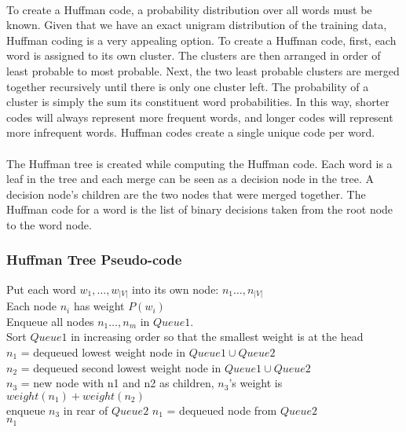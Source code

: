 \documentclass[12pt]{ociamthesis}  %
\begin{document}
\paragraph{}
To create a Huffman code, a probability distribution over all words must be known. Given that we have an exact unigram distribution of the training data, Huffman coding is a very appealing option. To create a Huffman code, first, each word is assigned to its own cluster.  The clusters are then arranged in order of least probable to most probable. Next, the two least probable clusters are merged together recursively until there is only one cluster left. The probability of a cluster is simply the sum its constituent word probabilities. In this way, shorter codes will always represent more frequent words, and longer codes will represent more infrequent words. Huffman codes create a single unique code per word.
\paragraph{}
The Huffman tree is created while computing the Huffman code. Each word is a leaf in the tree and each merge can be seen as a decision node in the tree. A decision node's children are the two nodes that were merged together. The Huffman code for a word is the list of binary decisions taken from the root node to the word node.

\subsubsection{Huffman Tree Pseudo-code}

\begin{algorithm}[H]
\SetAlgoLined
Put each word $w_1,\dots,w_{|V|}$ into its own node: $n_1\dots,n_{|V|}$
\\ Each node $n_i$ has weight $P(w_i)$
\\Enqueue all nodes $n_1\dots,n_m$ in $Queue1$.
\\Sort $Queue1$ in increasing order so that the smallest weight is at the head
\\  {
	$n_1$ = dequeued lowest weight node in $Queue1 \cup Queue2$
	\\$n_2$ = dequeued second lowest weight node in $Queue1 \cup Queue2$
	\\$n_3$ = new node with n1 and n2 as children,  $n_3$'s weight is $weight(n_1)+weight(n_2)$
	\\enqueue $n_3$ in rear of $Queue2$
}
$n_1$ = dequeued node from $Queue2$
\\ \Return $n_1$
\end{algorithm}
\end{document}
